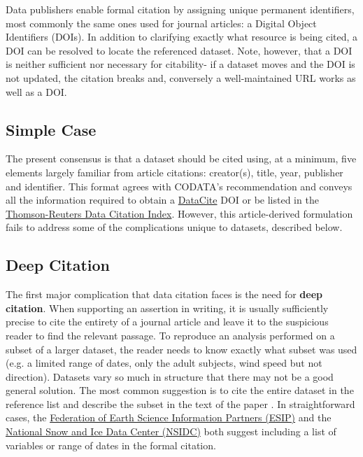 \documentclass[10pt,twocolumn]{article}
\begin{document}
Data publishers enable formal citation by assigning unique permanent identifiers, most commonly the same ones used for journal articles: a Digital Object Identifiers (DOIs).
In addition to clarifying exactly what resource is being cited, a DOI can be resolved to locate the referenced dataset.
Note, however, that a DOI is neither sufficient nor necessary for citability- if a dataset moves and the DOI is not updated, the citation breaks and, conversely a well-maintained URL works as well as a DOI.


\subsection*{Simple Case}\label{simple-case}

The present consensus is that a dataset should be cited using, at a minimum, five elements largely familiar from article citations: creator(s), title, year, publisher and identifier.
This format agrees with CODATA's recommendation\cite{codata-icsti_task_group_on_data_citation_standards_and_practices_out_2013} and conveys all the information required to obtain a \href{http://www.datacite.org/}{DataCite} DOI\cite{datacite_datacite_2013} or be listed in the \href{http://thomsonreuters.com/data-citation-index/}{Thomson-Reuters Data Citation Index}.
However, this article-derived formulation fails to address some of the complications unique to datasets, described below.

\subsection*{Deep Citation}\label{deep-citation}

The first major complication that data citation faces is the need for \textbf{deep citation}.
When supporting an assertion in writing, it is usually sufficiently precise to cite the entirety of a journal article and leave it to the suspicious reader to find the relevant passage.
To reproduce an analysis performed on a subset of a larger dataset, the reader needs to know exactly what subset was used (e.g. a limited range of dates, only the adult subjects, wind speed but not direction).
Datasets vary so much in structure that there may not be a good general solution.
The most common suggestion is to cite the entire dataset in the reference list and describe the subset in the text of the paper \cite{altman_a_2007}.
In straightforward cases, the \href{http://wiki.esipfed.org/index.php/Interagency_Data_Stewardship/Citations/provider_guidelines#Subset_Used}{Federation of Earth Science Information Partners (ESIP)} and the \href{http://nsidc.org/about/use_copyright.html}{National Snow and Ice Data Center (NSIDC)} both suggest including a list of variables or range of dates in the formal citation.
\end{document}
